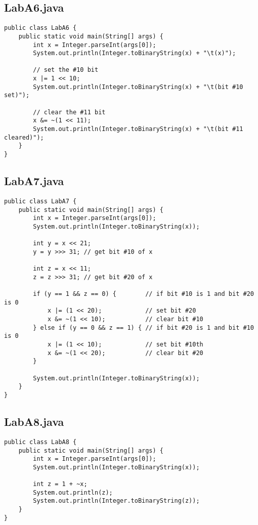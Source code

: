 \documentclass{article}
\begin{document}
\subsection{LabA6.java}
\begin{lstlisting}
public class LabA6 {
    public static void main(String[] args) {
        int x = Integer.parseInt(args[0]);
        System.out.println(Integer.toBinaryString(x) + "\t(x)");

        // set the #10 bit
        x |= 1 << 10;
        System.out.println(Integer.toBinaryString(x) + "\t(bit #10 set)");

        // clear the #11 bit
        x &= ~(1 << 11);
        System.out.println(Integer.toBinaryString(x) + "\t(bit #11 cleared)");
    }
}
\end{lstlisting}

\subsection{LabA7.java}
\begin{lstlisting}
public class LabA7 {
    public static void main(String[] args) {
        int x = Integer.parseInt(args[0]);
        System.out.println(Integer.toBinaryString(x));

        int y = x << 21;
        y = y >>> 31; // get bit #10 of x

        int z = x << 11;
        z = z >>> 31; // get bit #20 of x

        if (y == 1 && z == 0) {        // if bit #10 is 1 and bit #20 is 0
            x |= (1 << 20);            // set bit #20
            x &= ~(1 << 10);           // clear bit #10
        } else if (y == 0 && z == 1) { // if bit #20 is 1 and bit #10 is 0
            x |= (1 << 10);            // set bit #10th
            x &= ~(1 << 20);           // clear bit #20
        }

        System.out.println(Integer.toBinaryString(x));
    }
}
\end{lstlisting}

\subsection{LabA8.java}
\begin{lstlisting}
public class LabA8 {
    public static void main(String[] args) {
        int x = Integer.parseInt(args[0]);
        System.out.println(Integer.toBinaryString(x));

        int z = 1 + ~x;
        System.out.println(z);
        System.out.println(Integer.toBinaryString(z));
    }
}
\end{lstlisting}

\end{document}
